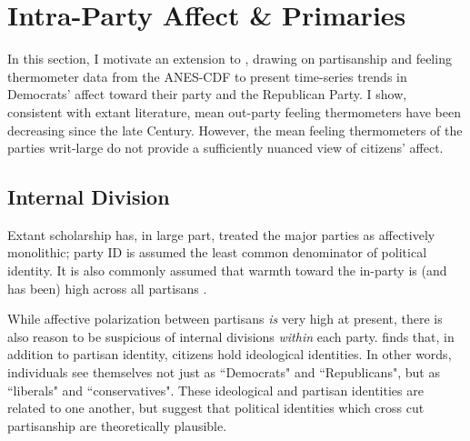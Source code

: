 \documentclass[12pt]{article}
\begin{document}
\section{Intra-Party Affect \& Primaries}

In this section, I motivate an extension to \citet{iyengar2012affect}, drawing on partisanship and feeling thermometer data from the ANES-CDF to present time-series trends in Democrats' affect toward their party and the Republican Party. I show, consistent with extant literature, mean out-party feeling thermometers have been decreasing since the late  Century. However, the mean feeling thermometers of the parties writ-large do not provide a sufficiently nuanced view of citizens' affect.

\subsection{Internal Division}
Extant scholarship has, in large part, treated the major parties as affectively monolithic; party ID is assumed the least common denominator of political identity. It is also commonly assumed that warmth toward the in-party is (and has been) high across all partisans \citep{iyengar2012affect}. 


 While affective polarization between partisans \textit{is} very high at present, there is also reason to be suspicious of internal divisions \textit{within} each party. \cite{mason2018ideologues} finds that, in addition to partisan identity, citizens hold ideological identities. In other words, individuals see themselves not just as ``Democrats" and ``Republicans", but as ``liberals" and ``conservatives". These  ideological and partisan identities are related to one another, but suggest that political identities which cross cut partisanship are theoretically plausible.
\end{document}
